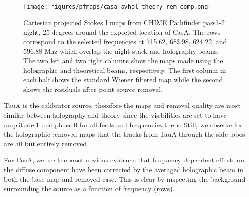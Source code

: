 \begin{figure}
\centering
\texttt{[image: figures/pfmaps/casa\_avhol\_theory\_rem\_comp.png]}
\caption{Cartesian projected Stokes I maps from CHIME Pathfinder pass1-2 night, 25 degrees around the expected location of CasA. The rows correspond to the selected frequencies at 715.62, 683.98, 624.22, and 596.88 Mhz which overlap the night stack and holography beams. The two left and two right columns show the maps made using the holographic and theoretical beams, respectively. The first column in each half shows the standard Wiener filtered map while the second shows the residuals after point source removal.}
\label{casa_comparison}
\end{figure}

TauA is the calibrator source, therefore the maps and removal quality are most similar between holography and theory since the visibilities are set to have amplitude 1 and phase 0 for all feeds and frequencies there. Still, we observe for the holographic removed maps that the tracks from TauA through the side-lobes are all but entirely removed.

For CasA, we see the most obvious evidence that frequency dependent effects on the diffuse component have been corrected by the averaged holographic beam in both the base map and removed case. This is clear by inspecting the background surrounding the source as a function of frequency (rows).
